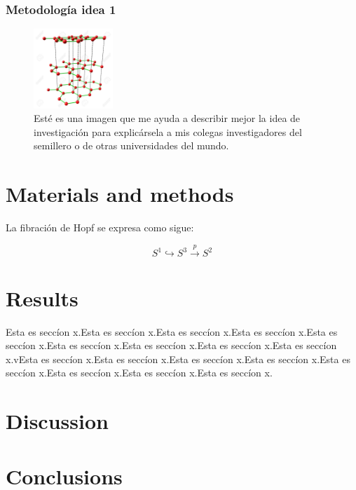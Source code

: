 \documentclass{article}
\begin{document}

\subsubsection{Metodología idea 1} %

\begin{figure}[h]
    \centering
        \includegraphics[height=3cm]{images/39620810-la-estructura-de-grafito.jpg}
    \caption{Esté es una imagen que me ayuda a describir mejor la idea de investigación para explicársela a mis colegas investigadores del semillero o de otras universidades del mundo. }
    \label{fig:fg1}
\end{figure}


\section{Materials and methods}
La fibración de Hopf se expresa como sigue:
\vspace{0.2in}

    \begin{equation}
         S^{1}\hookrightarrow S^{3} \xrightarrow{p}S^{2}
         \label{eq1}
    \end{equation}
    
    

\section{Results}

Esta es seccíon x.Esta es seccíon x.Esta es seccíon x.Esta es seccíon x.Esta es seccíon x.Esta es seccíon x.Esta es seccíon x.Esta es seccíon x.Esta es seccíon x.vEsta es seccíon x.Esta es seccíon x.Esta es seccíon x.Esta es seccíon x.Esta es seccíon x.Esta es seccíon x.Esta es seccíon x.Esta es seccíon x.

\section{Discussion}


\section{Conclusions}

\medskip
\printbibliography[title={Bibliography}]
\end{document}

